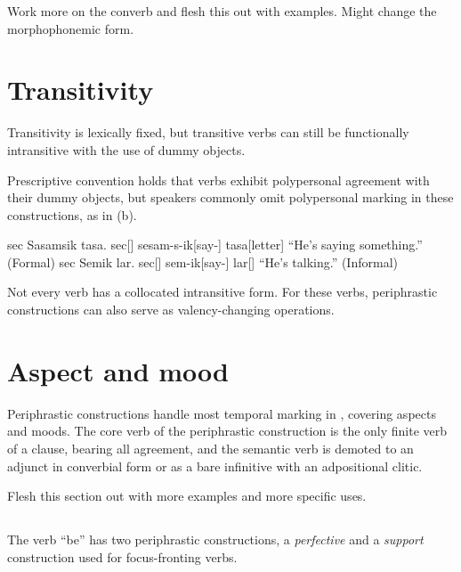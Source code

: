 \begin{kaobox}[frametitle=\sc todo:]
	Work more on the converb and flesh this out with examples. Might change the morphophonemic form.
\end{kaobox}

\section{Transitivity}
Transitivity is lexically fixed, but transitive verbs can still be functionally intransitive with the use of dummy objects.

Prescriptive convention holds that verbs exhibit polypersonal agreement with their dummy objects, but speakers commonly omit polypersonal marking in these constructions, as in (\nextx b).

\begin{gloss}
	\a \begingl
		\glpreamble sec Sasamsik tasa. \endpreamble
			sec[]
			sesam-s-ik[say-]
			tasa[letter]
		\glft “He's saying something.”
		\trailingcitation (Formal)
	\endgl
	\a \begingl
		\glpreamble sec Semik lar. \endpreamble
			sec[]
			sem-ik[say-]
			lar[]
		\glft “He's talking.”
		\trailingcitation (Informal)
	\endgl {}
\end{gloss}

Not every verb has a collocated intransitive form. For these verbs, periphrastic constructions can also serve as valency-changing operations.

\section{Aspect and mood}
Periphrastic constructions handle most temporal marking in \langname{}, covering aspects and moods. The core verb of the periphrastic construction is the only finite verb of a clause, bearing all agreement, and the semantic verb is demoted to an adjunct in converbial form or as a bare infinitive with an adpositional clitic.

\begin{kaobox}[frametitle=\sc todo:]
	Flesh this section out with more examples and more specific uses.
\end{kaobox}

\subsection{}
The verb  “be” has two periphrastic constructions, a \emph{perfective} and a \emph{support} construction used for focus-fronting verbs.

